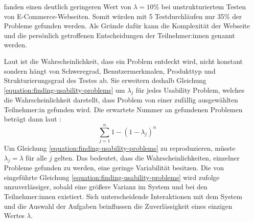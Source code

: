 \textcite{spoolTestingWeb2001} fanden einen deutlich geringeren Wert von $\lambda{}=10\%$ bei
unstrukturiertem Testen von E-Commerce-Webseiten. Somit würden mit 5 Testdurchläufen nur 35\% der
Probleme gefunden werden. Als Gründe dafür kann die Komplexität der Webseite und die persönlich
getroffenen Entscheidungen der Teilnehmer:innen genannt werden.
\parencite{spoolTestingWeb2001}

Laut \textcite{woolrychWhyWhen2001} ist die Wahrscheinlichkeit, dass ein Problem entdeckt wird,
nicht konstant sondern hängt von Schweregrad, Benutzermerkmalen, Produkttyp und Strukturierungsgrad
des Testes ab. Sie erweitern deshalb Gleichung \ref{equation:finding-usability-problems} um
$\lambda{}_j$ für jedes Usability Problem, welches die Wahrscheinlichkeit darstellt, dass Problem
von einer zufällig ausgewählten Teilnehmer:in gefunden wird. Die erwartete Nummer an gefundenen
Problemen beträgt dann laut \textcite{woolrychWhyWhen2001}:
\begin{equation}
  \sum_{j=1}^n 1-(1-\lambda{}_j)^n
\end{equation}
Um Gleichung \ref{equation:finding-usability-problems} zu reproduzieren, müsste $\lambda{}_j =
  \lambda{}$ für alle $j$ gelten. Das bedeutet, dass die Wahrscheinlichkeiten, einzelner Probleme
gefunden zu werden, eine geringe Variabilität besitzen. Die von
\textcite{nielsenMathematicalModel1993} eingeführte Gleichung
\ref{equation:finding-usability-problems} wird \textcite{woolrychWhyWhen2001} zufolge
unzuverlässiger, sobald eine größere Varianz im System und bei den Teilnehmer:innen existiert. Sich
unterscheidende Interaktionen mit dem System und die Auswahl der Aufgaben beinflussen die
Zuverlässigkeit eines einzigen Wertes $\lambda{}$.
\parencite{woolrychWhyWhen2001}


